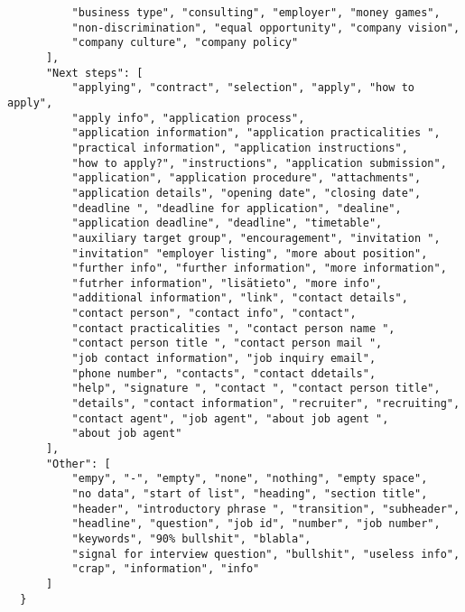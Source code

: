\begin{verbatim}
          "business type", "consulting", "employer", "money games",
          "non-discrimination", "equal opportunity", "company vision",
          "company culture", "company policy"
      ],
      "Next steps": [
          "applying", "contract", "selection", "apply", "how to apply",
          "apply info", "application process",
          "application information", "application practicalities ",
          "practical information", "application instructions",
          "how to apply?", "instructions", "application submission",
          "application", "application procedure", "attachments",
          "application details", "opening date", "closing date",
          "deadline ", "deadline for application", "dealine",
          "application deadline", "deadline", "timetable",
          "auxiliary target group", "encouragement", "invitation ",
          "invitation" "employer listing", "more about position",
          "further info", "further information", "more information",
          "futrher information", "lisätieto", "more info",
          "additional information", "link", "contact details",
          "contact person", "contact info", "contact",
          "contact practicalities ", "contact person name ",
          "contact person title ", "contact person mail ",
          "job contact information", "job inquiry email",
          "phone number", "contacts", "contact ddetails",
          "help", "signature ", "contact ", "contact person title",
          "details", "contact information", "recruiter", "recruiting",
          "contact agent", "job agent", "about job agent ",
          "about job agent"
      ],
      "Other": [
          "empy", "-", "empty", "none", "nothing", "empty space",
          "no data", "start of list", "heading", "section title",
          "header", "introductory phrase ", "transition", "subheader",
          "headline", "question", "job id", "number", "job number",
          "keywords", "90% bullshit", "blabla",
          "signal for interview question", "bullshit", "useless info",
          "crap", "information", "info"
      ]
  }
\end{verbatim}


